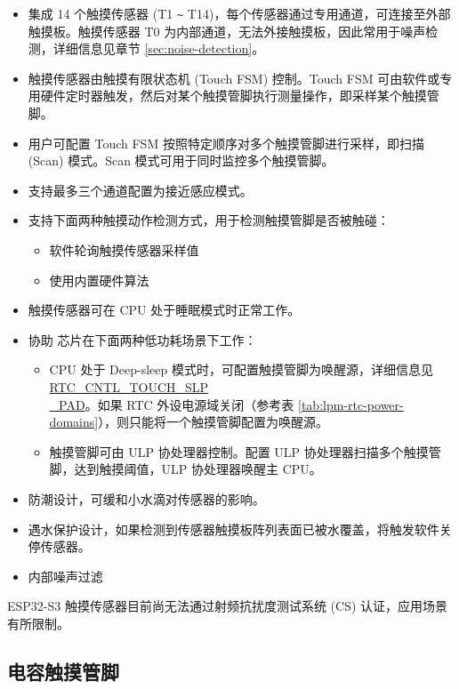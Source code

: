 \documentclass[main\_\_CN.tex]{subfiles}
\begin{document}
\begin{itemize}
    \item 集成 14 个触摸传感器 (T1 \verb+~+ T14)，每个传感器通过专用通道，可连接至外部触摸板。触摸传感器 T0 为内部通道，无法外接触摸板，因此常用于噪声检测，详细信息见章节 \ref{sec:noise-detection}。
    \item 触摸传感器由触摸有限状态机 (Touch FSM) 控制。Touch FSM 可由软件或专用硬件定时器触发，然后对某个触摸管脚执行测量操作，即采样某个触摸管脚。
    \item 用户可配置 Touch FSM 按照特定顺序对多个触摸管脚进行采样，即扫描 (Scan) 模式。Scan 模式可用于同时监控多个触摸管脚。
    \item 支持最多三个通道配置为接近感应模式。
    \item 支持下面两种触摸动作检测方式，用于检测触摸管脚是否被触碰：
    \begin{itemize}
        \item 软件轮询触摸传感器采样值
        \item 使用内置硬件算法
    \end{itemize}
    \item 触摸传感器可在 CPU 处于睡眠模式时正常工作。
    \item 协助 \chipname{} 芯片在下面两种低功耗场景下工作：
    \begin{itemize}
        \item CPU 处于 Deep-sleep 模式时，可配置触摸管脚为唤醒源，详细信息见 \hyperref[fielddesc:RTCCNTLTOUCHSLPPAD]{RTC\_CNTL\_TOUCH\_SLP\\\_PAD}。如果 RTC 外设电源域关闭（参考表 \ref{tab:lpm-rtc-power-domains}），则只能将一个触摸管脚配置为唤醒源。
        \item 触摸管脚可由 ULP 协处理器控制。配置 ULP 协处理器扫描多个触摸管脚，达到触摸阈值，ULP 协处理器唤醒主 CPU。
    \end{itemize}
    \item 防潮设计，可缓和小水滴对传感器的影响。
    \item 遇水保护设计，如果检测到传感器触摸板阵列表面已被水覆盖，将触发软件关停传感器。
    \item 内部噪声过滤
\end{itemize}

\begin{tiplisting}
ESP32-S3 触摸传感器目前尚无法通过射频抗扰度测试系统 (CS) 认证，应用场景有所限制。
\end{tiplisting}
\vspace{-1em}

\subsection{电容触摸管脚}
\end{document}
